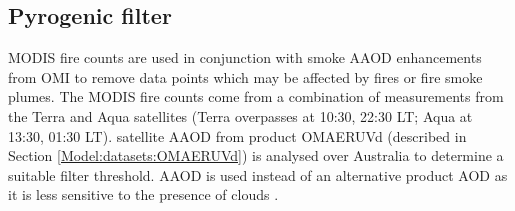   
  
  
  \subsection{Pyrogenic filter}
    \label{Model:filter:fire}
    
    MODIS fire counts are used in conjunction with smoke AAOD enhancements from OMI to remove data points which may be affected by fires or fire smoke plumes.
    The MODIS fire counts come from a combination of measurements from the Terra and Aqua satellites (Terra overpasses at 10:30, 22:30 LT; Aqua at 13:30, 01:30 LT).
    satellite AAOD from product OMAERUVd (described in Section \ref{Model:datasets:OMAERUVd}) is analysed over Australia to determine a suitable filter threshold.
    AAOD is used instead of an alternative product AOD as it is less sensitive to the presence of clouds \parencite{Ahn2008}.
    
